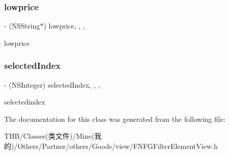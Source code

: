 \subsubsection{\texorpdfstring{lowprice}{lowprice}}
{\footnotesize\ttfamily -\/ (N\+S\+String$\ast$) lowprice\hspace{0.3cm}{\ttfamily [read]}, {\ttfamily [write]}, {\ttfamily [nonatomic]}, {\ttfamily [copy]}}

lowprice \mbox{\label{interface_f_n_f_g_filter_element_view_a935a417638f682acf786e671251143ae}} 
\subsubsection{\texorpdfstring{selected\+Index}{selectedIndex}}
{\footnotesize\ttfamily -\/ (N\+S\+Integer) selected\+Index\hspace{0.3cm}{\ttfamily [read]}, {\ttfamily [write]}, {\ttfamily [nonatomic]}, {\ttfamily [assign]}}

selectedindex 

The documentation for this class was generated from the following file\+:\begin{DoxyCompactItemize}
\item 
T\+H\+B/\+Classes(类文件)/\+Mine(我的)/\+Others/\+Partner/others/\+Goods/view/F\+N\+F\+G\+Filter\+Element\+View.\+h\end{DoxyCompactItemize}
